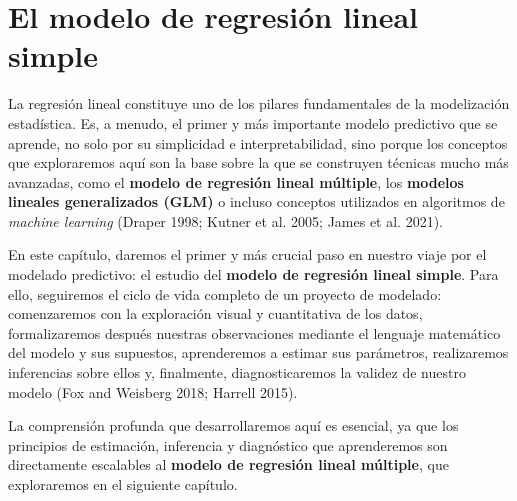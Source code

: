 \documentclass[
  letterpaper,
  DIV=11,
  numbers=noendperiod]{scrreprt}
\begin{document}

\chapter{El modelo de regresión lineal
simple}\label{sec-regresion-lineal-simple}

La regresión lineal constituye uno de los pilares fundamentales de la
modelización estadística. Es, a menudo, el primer y más importante
modelo predictivo que se aprende, no solo por su simplicidad e
interpretabilidad, sino porque los conceptos que exploraremos aquí son
la base sobre la que se construyen técnicas mucho más avanzadas, como el
\textbf{modelo de regresión lineal múltiple}, los \textbf{modelos
lineales generalizados (GLM)} o incluso conceptos utilizados en
algoritmos de \emph{machine learning} (Draper 1998; Kutner et al. 2005;
James et al. 2021).

En este capítulo, daremos el primer y más crucial paso en nuestro viaje
por el modelado predictivo: el estudio del \textbf{modelo de regresión
lineal simple}. Para ello, seguiremos el ciclo de vida completo de un
proyecto de modelado: comenzaremos con la exploración visual y
cuantitativa de los datos, formalizaremos después nuestras observaciones
mediante el lenguaje matemático del modelo y sus supuestos, aprenderemos
a estimar sus parámetros, realizaremos inferencias sobre ellos y,
finalmente, diagnosticaremos la validez de nuestro modelo (Fox and
Weisberg 2018; Harrell 2015).

La comprensión profunda que desarrollaremos aquí es esencial, ya que los
principios de estimación, inferencia y diagnóstico que aprenderemos son
directamente escalables al \textbf{modelo de regresión lineal múltiple},
que exploraremos en el siguiente capítulo.
\end{document}
